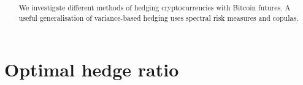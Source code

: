 \documentclass[square]{article} %
\theoremstyle{plain}
\theoremstyle{definition} %
\begin{document}
\setlength{\boxlength}{0.95\textwidth} %
\title{\large{\bf{}}} %
\author{{\normalsize\bf{}}}%
\thispagestyle{empty}
\addtocounter{page}{1}
\maketitle
\begin{abstract}
  We investigate different methods of hedging cryptocurrencies with
  Bitcoin futures. A useful generalisation of variance-based hedging
  uses spectral risk measures and copulas. 
\end{abstract}
\vspace{.5cm}
\def\contentsname{Contents}
\tableofcontents
\vspace{.5cm}

\section{Optimal hedge ratio}
\label{sec:optimal-hedge-ratio}
\end{document}
